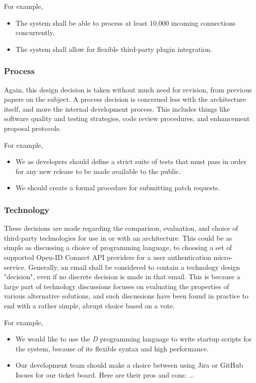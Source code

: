 \documentclass[a4paper, 12pt]{article}
\begin{document}
			For example,
			\begin{itemize}
				\item The system shall be able to process at least 10,000 incoming connections concurrently.
				\item The system shall allow for flexible third-party plugin integration.
			\end{itemize}
		
		\subsubsection{\textbf{Process}}
			Again, this design decision is taken without much need for revision, from previous papers on the subject. A process decision is concerned less with the architecture itself, and more the internal development process. This includes things like software quality and testing strategies, code review procedures, and enhancement proposal protocols.
			
			For example,
			\begin{itemize}
				\item We as developers should define a strict suite of tests that must pass in order for any new release to be made available to the public.
				\item We should create a formal procedure for submitting patch requests.
			\end{itemize}
		
		\subsubsection{\textbf{Technology}}
			These decisions are made regarding the comparison, evaluation, and choice of third-party technologies for use in or with an architecture. This could be as simple as discussing a choice of programming language, to choosing a set of supported Open-ID Connect API providers for a user authentication micro-service. Generally, an email shall be considered to contain a technology design "decision", even if no discrete decision is made in that email. This is because a large part of technology discussions focuses on evaluating the properties of various alternative solutions, and such discussions have been found in practice to end with a rather simple, abrupt choice based on a vote.
			
			For example,
			\begin{itemize}
				\item We would like to use the \textit{D} programming language to write startup scripts for the system, because of its flexible syntax and high performance\autocite{bright}.
				\item Our development team should make a choice between using Jira or GitHub Issues for our ticket board. Here are their pros and cons: ...
			\end{itemize}
	
\end{document}
